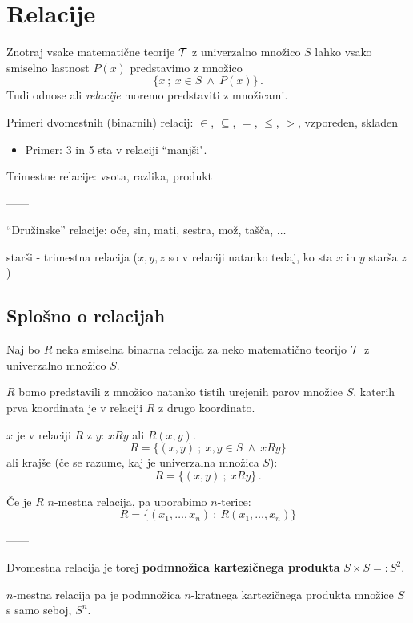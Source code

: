 \documentclass[11pt,paper=b5,DIV=13,headinclude,footinclude]{scrbook}
\def\inn {{~\wedge~}}
\begin{document}
\chapter{Relacije}


Znotraj vsake matematične teorije ${\cal T}$ z univerzalno množico $S$
lahko vsako smiselno lastnost $P(x)$ predstavimo z množico
$$\{x~;~x\in S\inn P(x)\}\,.$$
Tudi odnose ali {\em relacije} moremo predstaviti z množicami.

\medskip
Primeri dvomestnih (binarnih) relacij: $\in$, $\subseteq$, $=$, $\le$, $>$, vzporeden, skladen
\begin{itemize}
          \item Primer: 3 in 5 sta v relaciji ``manjši".
\end{itemize}
Trimestne relacije: vsota, razlika, produkt

------

``Družinske'' relacije: oče, sin, mati, sestra, mož, tašča, $\ldots$

starši - trimestna relacija ($x,y,z$ so v relaciji natanko tedaj, ko sta $x$ in $y$ starša $z$)

\section{Splošno o relacijah}

Naj bo $R$ neka smiselna binarna relacija za neko matematično teorijo ${\cal T}$ z univerzalno množico $S$.

$R$ bomo predstavili z množico natanko tistih urejenih parov množice $S$,
katerih prva koordinata je v relaciji $R$ z drugo koordinato.

$x$ je v relaciji $R$ z $y$: $xRy$ ali $R(x,y)$.
$$R = \{(x,y)~;~x,y\in S\inn xRy\}$$
ali krajše (če se razume, kaj je univerzalna množica $S$):
$$R = \{(x,y)~;~xRy\}\,.$$

\medskip
Če je $R$ $n$-mestna relacija, pa uporabimo $n$-terice:
$$R = \{(x_1,\ldots, x_n)~;~R(x_1,\ldots, x_n)\}$$

------

Dvomestna relacija je torej \textbf{ podmnožica kartezičnega produkta} $S\times S =: S^2$.

$n$-mestna relacija pa je podmnožica $n$-kratnega kartezičnega produkta množice $S$ s samo seboj, $S^n$.
\end{document}
